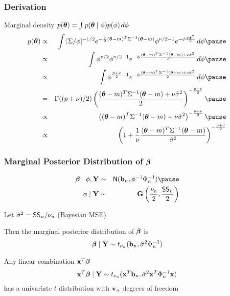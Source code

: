 \documentclass[]{beamer}
\begin{document}
\begin{frame}
  \frametitle{Derivation}
Marginal density  $p(\boldsymbol{\theta}) = \int p(\boldsymbol{\theta} \mid \phi) p(\phi) \, d\phi$
\pause
\begin{eqnarray*}
  p(\tb) & \propto & \int |\Sigma/\phi|^{-1/2}
e^{- \frac{\phi}{2} (\tb - m)^T
    \Sigma^{-1} (\tb - m)}  \phi^{\nu/2 - 1} e^{- \phi \frac{\nu
      \shat}{2}}\, d \phi \pause \\
  & \propto & \int \phi^{p/2} \phi^{\nu/2 - 1}
e^{- \phi \frac{(\tb - m)^T
    \Sigma^{-1} (\tb - m)+  \nu
      \shat}{2}}\, d \phi \pause \\
 & \propto & \int \phi^{\frac{p +\nu}{2} - 1}
e^{- \phi \frac{(\tb - m)^T
    \Sigma^{-1} (\tb - m)+  \nu
      \shat}{2}} \, d \phi \pause \\
& = & \Gamma((p + \nu)/2 ) \left( \frac{(\tb - m)^T
    \Sigma^{-1} (\tb - m)+  \nu
      \shat}{2} \right)^{- \frac{p + \nu}{2}} \pause \\
& \propto &  \left( (\tb - m)^T
    \Sigma^{-1} (\tb - m)+  \nu
      \shat \right)^{- \frac{p + \nu}{2}} \pause \\
& \propto &  \left( 1 + \frac{1}{\nu}  \frac{(\tb - m)^T
    \Sigma^{-1} (\tb - m)}{\shat}
       \right)^{- \frac{p + \nu}{2}}
\end{eqnarray*}
\end{frame}

\begin{frame}
  \frametitle{Marginal Posterior Distribution of $\boldsymbol{\beta}$}
  \begin{eqnarray*}
\b \mid \phi, \Y  & \sim & \N( \bv_n, \phi^{-1} \Phi_n^{-1}) \pause \\
 \phi \mid \Y & \sim & \G\left(\frac{\nu_n}{2},  \frac{\SS_n}{ 2} \right)
  \end{eqnarray*}
\pause

Let ${\hat{\sigma}}^2 = \textsf{SS}_n/\nu_n$  (Bayesian MSE) \pause

Then the marginal posterior distribution of $\boldsymbol{\beta}$ is
$$
\boldsymbol{\beta}  \mid \mathbf{Y} \sim t_{\nu_n} (\mathbf{b}_n, {\hat{\sigma}}^2 \Phi_n^{-1})
$$ \pause


Any linear combination $\mathbf{x}^T\boldsymbol{\beta}$
$$\mathbf{x}^T\boldsymbol{\beta}  \mid \mathbf{Y} \sim t_{\nu_n}
(\mathbf{x}^T\mathbf{b}_n, {\hat{\sigma}}^2 \mathbf{x}^T\Phi_n^{-1}\mathbf{x})$$ has a univariate
$t$ distribution with $\mathbf{v}_n$ degrees of freedom

\end{frame}
\end{document}
